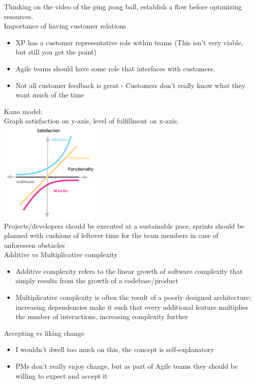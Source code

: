 \documentclass[10pt]{article}
\begin{document}
Thinking on the video of the ping pong ball, establish a flow before optimizing resources.\\
Importance of having customer relations
\begin{itemize}
\item XP has a customer representative role within teams (This isn't very viable, but still you get the point)
\item Agile teams should have some role that interfaces with customers.
\item Not all customer feedback is great - Customers don't really know what they want much of the time
\end{itemize}
Kano model:\\
Graph satisfaction on y-axis, level of fulfillment on x-axis.\\
\includegraphics[width=5cm, height=5cm]{kano}\\
Projects/developers should be executed at a sustainable pace, sprints should be planned with cushions of leftover time for the team members in case of unforeseen obstacles\\
Additive vs Multiplicative complexity
\begin{itemize}
\item Additive complexity refers to the linear growth of software complexity that simply results from the growth of a codebase/product
\item Multiplicative complexity is often the result of a poorly designed architecture; increasing dependencies make it such that every additional feature multiplies the number of interactions, increasing complexity further
\end{itemize}
Accepting vs liking change
\begin{itemize}
\item I wouldn't dwell too much on this, the concept is self-explanatory
\item PMs don't really enjoy change, but as part of Agile teams they should be willing to expect and accept it
\end{itemize}
\end{document}
